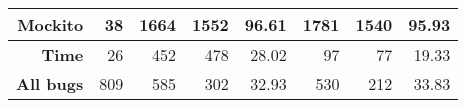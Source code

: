\begin{table*}[ht!]
{\begin{tabular}{|r|r|rrr|rrr|}
            \textbf{Mockito}                        & 38                                     & \multicolumn{1}{r|}{1664} & \multicolumn{1}{r|}{1552} & 96.61                 & \multicolumn{1}{r|}{1781} & \multicolumn{1}{r|}{1540} & 95.93                 \\ \hline
            \textbf{Time}                           & 26                                     & \multicolumn{1}{r|}{452}  & \multicolumn{1}{r|}{478}  & 28.02                 & \multicolumn{1}{r|}{97}   & \multicolumn{1}{r|}{77}   & 19.33                 \\ \hline
            \hline
            \textbf{All bugs}                       & 809                                    & \multicolumn{1}{r|}{585}  & \multicolumn{1}{r|}{302}  & 32.93                 & \multicolumn{1}{r|}{530}  & \multicolumn{1}{r|}{212}  & 33.83                 \\ \hline
        \end{tabular}
    }
\end{table*}
